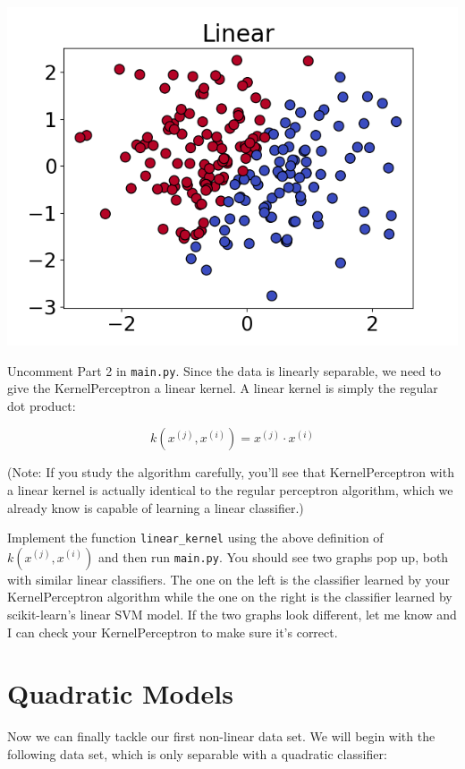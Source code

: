 \documentclass{article}
\begin{document}
\noindent
\includegraphics[width=\textwidth]{linear.png}

Uncomment Part 2 in \texttt{main.py}. Since the data is linearly separable, we need to give the KernelPerceptron a linear kernel. A linear kernel is simply the regular dot product:

$$k \left( x^{(j)}, x^{(i)} \right) = x^{(j)}\cdot x^{(i)}$$

(Note: If you study the algorithm carefully, you'll see that KernelPerceptron with a linear kernel is actually identical to the regular perceptron algorithm, which we already know is capable of learning a linear classifier.)

Implement the function \texttt{linear\_kernel} using the above definition of $k \left( x^{(j)}, x^{(i)} \right)$ and then run \texttt{main.py}. You should see two graphs pop up, both with similar linear classifiers. The one on the left is the classifier learned by your KernelPerceptron algorithm while the one on the right is the classifier learned by scikit-learn's linear SVM model. If the two graphs look different, let me know and I can check your KernelPerceptron to make sure it's correct.

\section{Quadratic Models}

Now we can finally tackle our first non-linear data set. We will begin with the following data set, which is only separable with a quadratic classifier:
\end{document}
